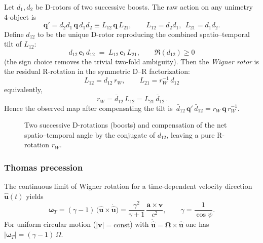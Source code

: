 \documentclass[11pt]{article}
\numberwithin{equation}{section}
\providecommand{\uhat}{\hat{\mathbf u}}
\begin{document}
Let $d_1,d_2$ be D-rotors of two successive boosts. The raw action on any unimetry 4-object is
\begin{equation}
\label{eq:auto:34}
\mathbf q' = d_2 d_1\, \mathbf q\, d_1 d_2 \equiv L_{12}\,\mathbf q\,L_{21},\qquad
L_{12}=d_2 d_1,\ \ L_{21}=d_1 d_2.
\end{equation}
Define $d_{12}$ to be the unique D-rotor reproducing the combined spatio--temporal tilt of $L_{12}$:
\begin{equation}
\boxed{\, d_{12}\,\mathbf e_t\, d_{12} \;=\; L_{12}\,\mathbf e_t\, L_{21},\qquad \Re(d_{12})\ge0 \,}
\label{eq:d12-uniqueness}
\end{equation}
(the sign choice removes the trivial two-fold ambiguity). Then the \emph{Wigner rotor} is the residual
R-rotation in the symmetric D--R factorization:
\begin{equation}
\boxed{\, L_{12}=d_{12}\,r_W,\qquad L_{21}=r_W^{-1}\,d_{12} \,}
\label{eq:DR-polar}
\end{equation}
equivalently,
\begin{equation}
\boxed{\, r_W=\bar d_{12}\,L_{12}=L_{21}\,\bar d_{12} \,}.
\label{eq:wigner-rotor-def}
\end{equation}
Hence the observed map after compensating the tilt is $\,\bar d_{12}\,\mathbf q'\,\bar d_{12}=r_W\,\mathbf q\,r_W^{-1}$.

\begin{figure}[!ht]
\centering
{}
\caption{Two successive D-rotations (boosts) and compensation of the net spatio--temporal angle by the conjugate of $d_{12}$, leaving a pure R-rotation $r_W$.}
\label{fig:tikz-wigner-pullback}
\end{figure}

\subsubsection{Thomas precession}
\label{subsec:thomas}
The continuous limit of Wigner rotation for a time-dependent velocity direction $\uhat(t)$ yields
\begin{equation}
\label{eq:auto:38}
\boldsymbol{\omega}_T=(\gamma-1)\,\bigl(\uhat\times \dot{\uhat}\bigr)
=\frac{\gamma^2}{\gamma+1}\,\frac{\mathbf a\times \mathbf v}{c^2},\qquad
\gamma=\frac{1}{\cos\psi}.
\end{equation}
For uniform circular motion ($|\mathbf v|=\mathrm{const}$) with $\dot{\uhat}=\boldsymbol{\Omega}\times\uhat$ one has
$\lvert\boldsymbol{\omega}_T\rvert=(\gamma-1)\,\Omega$.
\end{document}
